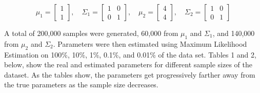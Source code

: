 \documentclass{article}
\begin{document}
\begin{equation}
\mu_{1} = \begin{bmatrix} 1 \\ 1 \end{bmatrix}, 
\quad \Sigma_{1} = \begin{bmatrix} 1 & 0 \\ 0 & 1 \end{bmatrix}, 
\quad \mu_{2} = \begin{bmatrix} 4 \\ 4 \end{bmatrix}, 
\quad \Sigma_{2} = \begin{bmatrix} 1 & 0 \\ 0 & 1 \end{bmatrix}
\label{eq:exp1_params}
\end{equation}

\noindent A total of 200,000 samples were generated, 60,000 from $\mu_{1}$ and $\Sigma_{1}$, and 140,000 from $\mu_{2}$ and $\Sigma_{2}$. Parameters were 
then estimated using Maximum Likelihood Estimation on 100\%, 10\%, 1\%, 0.1\%, and 0.01\% of the data set. Tables 1 and 2, below, 
show the real and estimated parameters for different sample sizes of the dataset. As the tables show, the parameters get 
progressively farther away from the true parameters as the sample size decreases. 
\end{document}
